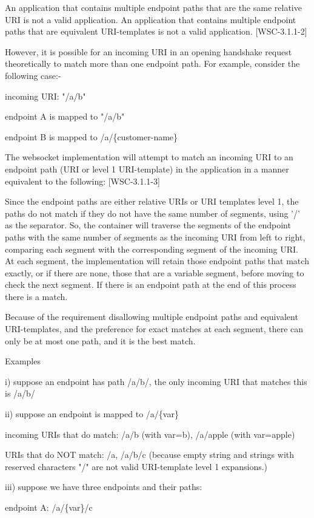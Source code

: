 An application that contains multiple endpoint paths that are the same relative URI is not a valid application. An application that contains multiple endpoint paths that are equivalent URI-templates is not a valid application. [WSC-3.1.1-2]

However, it is possible for an incoming URI in an opening handshake request theoretically to match more than one endpoint path. For example, consider the following case:-

incoming URI: "/a/b"

endpoint A is mapped to "/a/b"

endpoint B is mapped to /a/\{customer-name\}

The  websocket implementation will attempt to match an incoming URI to an endpoint path (URI or level 1 URI-template) in the application in a manner equivalent to the following: [WSC-3.1.1-3]

Since the endpoint paths are either relative URIs or URI templates level 1, the paths do not match if they do not have the same number of segments, using '/' as the separator. So, the container will traverse the segments of the endpoint paths with the same number of segments as the incoming URI from left to right, comparing each segment with the corresponding segment of the incoming URI. At each segment, the implementation will retain those endpoint paths that match exactly, or if there are none, those that are a variable segment, before moving to check the next segment. If there is an endpoint path at the end of this process there is a match.

Because of the requirement disallowing multiple endpoint paths and equivalent URI-templates, and the preference for exact matches at each segment, there can only be at most one path, and it is the best match.


Examples

i) suppose an endpoint has path /a/b/, the only incoming URI that matches this is /a/b/


ii) suppose an endpoint is mapped to /a/\{var\}

incoming URIs that do match: /a/b (with var=b), /a/apple (with var=apple)

URIs that do NOT match: /a, /a/b/c (because empty string and strings with reserved characters "/" are not valid URI-template level 1 expansions.)


iii) suppose we have three endpoints and their paths:

endpoint A: /a/\{var\}/c

